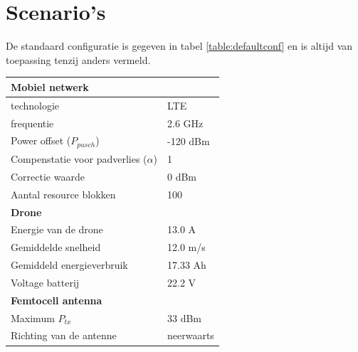\documentclass[twocolumn]{phdsymp_dutch}
\begin{document}

\section{Scenario's}

De standaard configuratie is gegeven in tabel \ref{table:defaultconf} en is altijd van toepassing tenzij anders vermeld.
\begin{table}[!htb]
\centering
\begin{tabular}[t]{ll}
        \toprule
        \multicolumn{2}{l}{\textbf{Mobiel netwerk}} \\
        \hline
        \hspace{3mm}  technologie        & LTE     \\
        \hspace{3mm}  frequentie         & 2.6 GHz \\
        \hspace{3mm}  Power offset ($P_{pusch}$)            & -120 dBm  \\
        \hspace{3mm}  Compenstatie voor padverlies ($\alpha$)   & 1  \\
        \hspace{3mm}  Correctie waarde                    & 0 dBm  \\
        \hspace{3mm}  Aantal resource blokken      & 100  \\
        \hline
        \multicolumn{2}{l}{\textbf{Drone}} \\
        \hline  
        \hspace{3mm}  Energie van de drone        & 13.0 A   \\
        \hspace{3mm}  Gemiddelde snelheid        & 12.0 m/s \\
        \hspace{3mm}  Gemiddeld energieverbruik      & 17.33 Ah    \\
        \hspace{3mm}  Voltage batterij       & 22.2 V \\
        \hline
        \multicolumn{2}{l}{\textbf{Femtocell antenna}} \\
        \hline  
        \hspace{3mm}  Maximum $P_{tx}$          & 33 dBm   \\
        \hspace{3mm}  Richting van de antenne   & neerwaarts   \\ 

\end{tabular}
\end{table}
\end{document}
